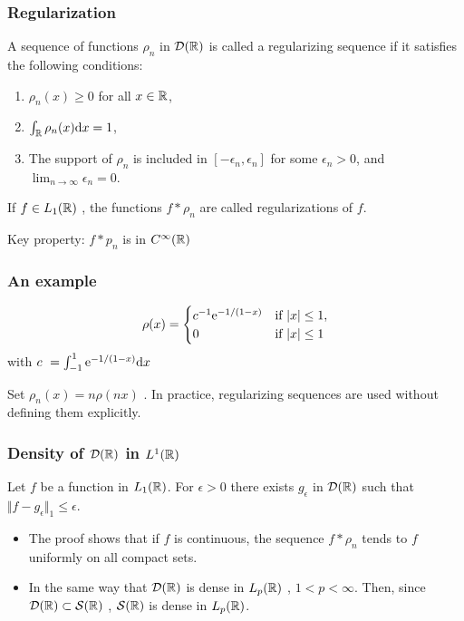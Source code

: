 \begin{frame}
\frametitle{Regularization}
\begin{definition}
A sequence of functions $\rho_{n}$ in $\mathcal{D}(\mathbb{R})$  is called a regularizing sequence if it satisfies the following conditions:
\begin{enumerate}[label=(\roman*)]
\item $\rho_{n}(x)\geq 0$ for all $ x\in \mathbb{R}$,
\item $\int_{\mathbb{R}}\rho_{n}(x) \mathrm{d} x=1$,
\item The support of $\rho_{n}$ is included in $[-\epsilon_{n},\epsilon_{n}]$ for some $\epsilon_{n}>0$, and $\lim_{n\rightarrow\infty}\epsilon_{n}=0$.
\end{enumerate}
\end{definition}
\begin{definition}
If $ f\in L_1(\mathbb{R})$ , the functions $f*\rho_{n}$ are called \alert{regularizations} of $f$.
\end{definition}
\alert{Key property:} $f*p_{n}$ is in $C^{\infty}(\mathbb{R})$
\end{frame}

\begin{frame}
\frametitle{An example}
$$\rho(x)=
\begin{cases}
c^{-1} \mathrm{e}^{-1/(1-x)} &  \text{if $|x|\leq 1$},\\
0 & \text{if $|x|\leq 1$}
\end{cases}
$$
with $c\ =\int_{-1}^{1} \mathrm{e}^{-1/(1-x)} \mathrm{d} x$

Set $\rho_{n}(x)=n\rho(nx)$ . In practice, regularizing sequences are used without defining them explicitly.
\end{frame}

\begin{frame}
\frametitle{Density of $\mathcal{D}(\mathbb{R})$ in $L^{1}(\mathbb{R})$}
\begin{theorem}
Let $f$ be a function in $L_1(\mathbb{R})$. For $\epsilon>0$ there exists $g_\epsilon$ in $\mathcal{D}(\mathbb{R})$ such that $\Vert f-g_{\epsilon}\Vert_{1}\leq\epsilon$.
\end{theorem}
\begin{itemize}
\item The proof shows that if $f$ is continuous, the sequence $f*\rho_{n}$ tends to $f$ uniformly on all compact sets.
\item In the same way that $\mathcal{D}(\mathbb{R})$ is dense in $L_{p}(\mathbb{R})$ , $ 1<p<\infty$. Then, since $\mathcal{D}(\mathbb{R}) \subset \mathcal{S}(\mathbb{R})$ , $\mathcal{S}(\mathbb{R})$ is dense in $L_{p}(\mathbb{R})$.
\end{itemize}
\end{frame}

